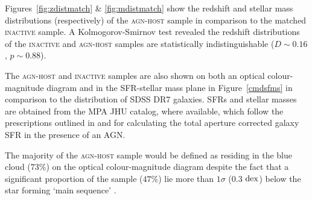 Figures~\ref{fig:zdistmatch} \& \ref{fig:mdistmatch} show the redshift and stellar mass distributions (respectively) of the \textsc{agn-host} sample in comparison to the matched \textsc{inactive} sample. A Kolmogorov-Smirnov test revealed the redshift distributions of the \textsc{inactive} and \textsc{agn-host} samples are statistically indistinguishable ($D \sim 0.16$, $p \sim 0.88$). 

The \textsc{agn-host} and \textsc{inactive}  samples are also shown on both an optical colour-magnitude diagram and in the SFR-stellar mass plane in Figure~\ref{cmdsfms} in comparison to the distribution of SDSS DR7 galaxies. SFRs and stellar masses are obtained from the MPA JHU catalog, where available, which follow the prescriptions outlined in \cite{brinchmann04} and \cite{Salim07} for calculating the total aperture corrected galaxy SFR in the presence of an AGN. 

The majority of the \textsc{agn-host} sample would be defined as residing in the blue cloud ($73\%$) on the optical colour-magnitude diagram despite the fact that a significant proportion of the sample ($47\%$) lie more than $1\sigma$ ($0.3$ $\rm{dex}$) below the star forming `main sequence' \citep[][see Figure \ref{cmdsfms} and Table~\ref{table:agnqsubs}]{peng10}.

